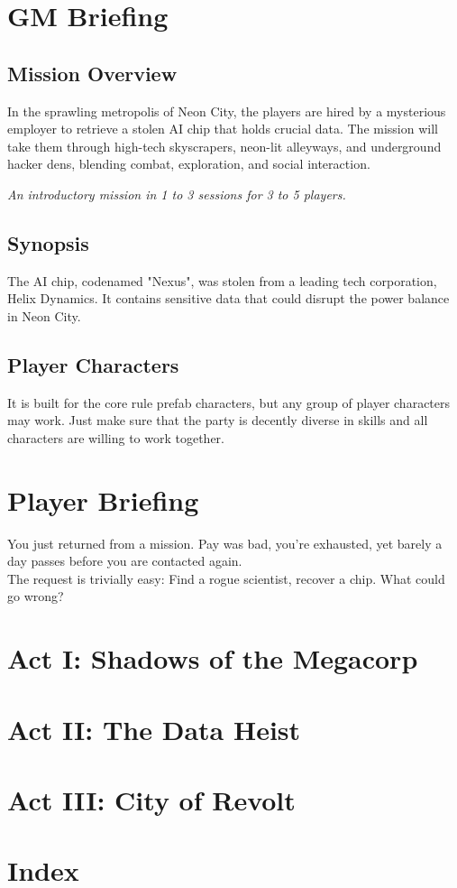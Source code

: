\documentclass[12pt,a4paper,openany]{book}
\begin{document}
	
	
	\chapter{GM Briefing}
	\section{Mission Overview}
	In the sprawling metropolis of Neon City,
		the players are hired by a mysterious employer to retrieve a stolen AI chip that holds crucial data.
	The mission will take them through high-tech skyscrapers,
		neon-lit alleyways, and underground hacker dens,
		blending combat, exploration, and social interaction.
	\par
	\emph{An introductory mission in 1 to 3 sessions for 3 to 5 players.}
	\section{Synopsis}
	The AI chip, codenamed "Nexus", was stolen from a leading tech corporation, Helix Dynamics.
	It contains sensitive data that could disrupt the power balance in Neon City.
	\section{Player Characters}
	It is built for the core rule prefab characters,
		but any group of player characters may work.
	Just make sure that the party is decently diverse in skills
		and all characters are willing to work together.
	
	\chapter{Player Briefing}
	You just returned from a mission.
	Pay was bad, you're exhausted,
		yet barely a day passes before you are contacted again.
	\\%
	The request is trivially easy:
	Find a rogue scientist, recover a chip.
	What could go wrong?
	
	\chapter{Act I: Shadows of the Megacorp}
	\label{ch:act1}
	
	
	\chapter{Act II: The Data Heist}
	\label{ch:act2}
	
	
	\chapter{Act III: City of Revolt}
	\label{ch:act3}
	
	
	\chapter{Index}
	\label{ch:index}
	
	
\end{document}
